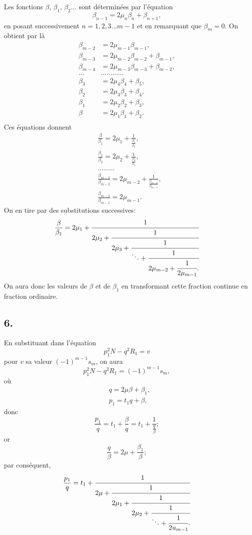 \documentclass[oneside, 12 pt, leqno]{memoir}
\begin{document}
Les fonctions \(\beta\), \(\beta_1\), \(\beta_2 \dots\) sont déterminées par l'équation
\[\beta_{n-1}=2 \mu_n \beta_n+\beta_{n+1},\]
en posant successivement \(n=1,2,3 \dots m-1\) et en remarquant que \({\beta}_m=0\). On obtient par là
\[\begin{aligned}
 \beta_{m-2}&=2 \mu_{m-1} \beta_{m-1}, \\
 \beta_{m-3}&=2 \mu_{m-2} \beta_{m-2}+\beta_{m-1}, \\
 \beta_{m-4}&=2 \mu_{m-3} \beta_{m-3}+\beta_{m-2}, \\
 \dots &\dots \dots \dots \dots \\
 \beta_3&=2 \mu_4 \beta_4+\beta_5, \\
 \beta_2&=2 \mu_3 \beta_3+\beta_4,  \\
 \beta_1&=2 \mu_2 \beta_2+\beta_3, \\
 \beta &=2 \mu_1 \beta_1+\beta_2. \\
\end{aligned}\]
Ces équations donnent
\[\begin{aligned}
& \frac{\beta}{\beta_1}=2 \mu_1+\frac{1}{\frac{\beta_1}{\beta_2}}, \\
& \frac{\beta_1}{\beta_2}=2 \mu_2 +\frac{1}{\frac{\beta_2}{\beta_3}}, \\
& \dots \dots \dots \\
& \frac{\beta_{m-3}}{\beta_{m-2}}=2 \mu_{m-2}+\frac{1}{\frac{\beta_{m-2}}{\beta_{m-1}}}, \\
& \frac{\beta_{m-2}}{\beta_{m-1}}=2 \mu_{m-1}.
\end{aligned}\]
On en tire par des substitutions successives:
\[\frac{\beta}{\beta_1}=2 \mu_1+\cfrac{1}{2 \mu_2+\cfrac{1}{2 \mu_3+\cfrac{1}{\ddots+\cfrac{1}{2 \mu_{m-2}+\cfrac{1}{2 \mu_{m-1}}.}}}}\]
On aura donc les valeurs de \(\beta\) et de \(\beta_1\) en transformant cette fraction continue en fraction ordinaire.

\subsection*{6.}

En substituant dans l'équation
\[p_1^2 N-q^2 R_1=v\]
pour \(v\) sa valeur \((-1)^{m-1} s_m\), on aura
\[p_1^2 N-q^2 R_1=(-1)^{m-1} s_m,\]
où
\[\begin{aligned}
& q=2 \mu \beta+\beta_1, \\
& p_1=t_1 q+\beta,
\end{aligned}\]
donc
\[\frac{p_1}{q}=t_1+\frac{\beta}{q}=t_1+\frac{1}{\frac{q}{\beta}};\]
or
\[\frac{q}{\beta}=2\mu+\frac{\beta_1}{\beta};\]
par conséquent,
\[\frac{p_1}{q}=t_1+\cfrac{1}{2 \mu+\cfrac{1}{2 \mu_1+\cfrac{1}{2 \mu_2+\cfrac{1}{\ddots+\cfrac{1}{2 u_{m-1}}.}}}}\]
\end{document}
